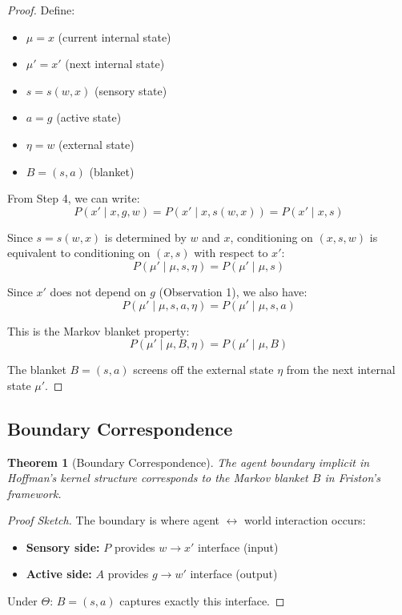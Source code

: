 \documentclass[11pt,a4paper]{article}
\theoremstyle{definition}
\theoremstyle{plain}
\newtheorem{theorem}[definition]{Theorem}
\theoremstyle{remark}
\begin{document}
\begin{proof}
Define:
\begin{itemize}
    \item $\mu = x$ (current internal state)
    \item $\mu' = x'$ (next internal state)
    \item $s = s(w, x)$ (sensory state)
    \item $a = g$ (active state)
    \item $\eta = w$ (external state)
    \item $B = (s, a)$ (blanket)
\end{itemize}

From Step 4, we can write:
\[
P(x' \mid x, g, w) = P(x' \mid x, s(w, x)) = P(x' \mid x, s)
\]

Since $s = s(w, x)$ is determined by $w$ and $x$, conditioning on $(x, s, w)$ is equivalent to conditioning on $(x, s)$ with respect to $x'$:
\[
P(\mu' \mid \mu, s, \eta) = P(\mu' \mid \mu, s)
\]

Since $x'$ does not depend on $g$ (Observation 1), we also have:
\[
P(\mu' \mid \mu, s, a, \eta) = P(\mu' \mid \mu, s, a)
\]

This is the Markov blanket property:
\[
\boxed{P(\mu' \mid \mu, B, \eta) = P(\mu' \mid \mu, B)}
\]

The blanket $B = (s, a)$ screens off the external state $\eta$ from the next internal state $\mu'$.
\end{proof}

\subsection{Boundary Correspondence}

\begin{theorem}[Boundary Correspondence]\label{thm:boundary}
The agent boundary implicit in Hoffman's kernel structure corresponds to the Markov blanket $B$ in Friston's framework.
\end{theorem}

\begin{proof}[Proof Sketch]
The boundary is where agent $\leftrightarrow$ world interaction occurs:
\begin{itemize}
    \item \textbf{Sensory side:} $P$ provides $w \to x'$ interface (input)
    \item \textbf{Active side:} $A$ provides $g \to w'$ interface (output)
\end{itemize}
Under $\Theta$: $B = (s, a)$ captures exactly this interface.
\end{proof}
\end{document}
